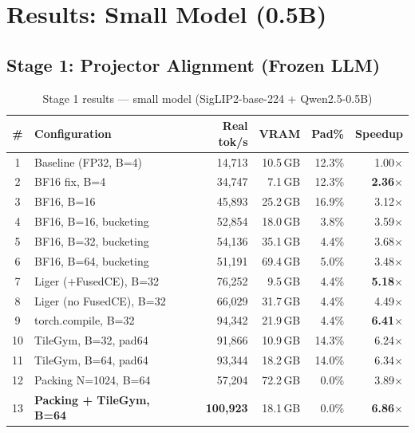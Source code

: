 \documentclass[11pt,a4paper]{article}
\begin{document}
\section{Results: Small Model (0.5B)}
\label{sec:results_small}

\subsection{Stage 1: Projector Alignment (Frozen LLM)}

\begin{table}[H]
\centering
\caption{Stage 1 results --- small model (SigLIP2-base-224 + Qwen2.5-0.5B)}
\label{tab:s1_small}
\small
\begin{tabular}{@{}clrrrr@{}}
\toprule
\# & Configuration & Real tok/s & VRAM & Pad\% & Speedup \\
\midrule
1 & Baseline (FP32, B=4) & 14,713 & 10.5\,GB & 12.3\% & 1.00$\times$ \\
2 & BF16 fix, B=4 & 34,747 & 7.1\,GB & 12.3\% & \textbf{2.36$\times$} \\
3 & BF16, B=16 & 45,893 & 25.2\,GB & 16.9\% & 3.12$\times$ \\
4 & BF16, B=16, bucketing & 52,854 & 18.0\,GB & 3.8\% & 3.59$\times$ \\
5 & BF16, B=32, bucketing & 54,136 & 35.1\,GB & 4.4\% & 3.68$\times$ \\
6 & BF16, B=64, bucketing & 51,191 & 69.4\,GB & 5.0\% & 3.48$\times$ \\
\midrule
7 & Liger (+FusedCE), B=32 & 76,252 & 9.5\,GB & 4.4\% & \textbf{5.18$\times$} \\
8 & Liger (no FusedCE), B=32 & 66,029 & 31.7\,GB & 4.4\% & 4.49$\times$ \\
9 & torch.compile, B=32 & 94,342 & 21.9\,GB & 4.4\% & \textbf{6.41$\times$} \\
10 & TileGym, B=32, pad64 & 91,866 & 10.9\,GB & 14.3\% & 6.24$\times$ \\
11 & TileGym, B=64, pad64 & 93,344 & 18.2\,GB & 14.0\% & 6.34$\times$ \\
\midrule
12 & Packing N=1024, B=64 & 57,204 & 72.2\,GB & 0.0\% & 3.89$\times$ \\
13 & \textbf{Packing + TileGym, B=64} & \textbf{100,923} & 18.1\,GB & 0.0\% & \textbf{6.86$\times$} \\
\bottomrule
\end{tabular}
\end{table}
\end{document}
